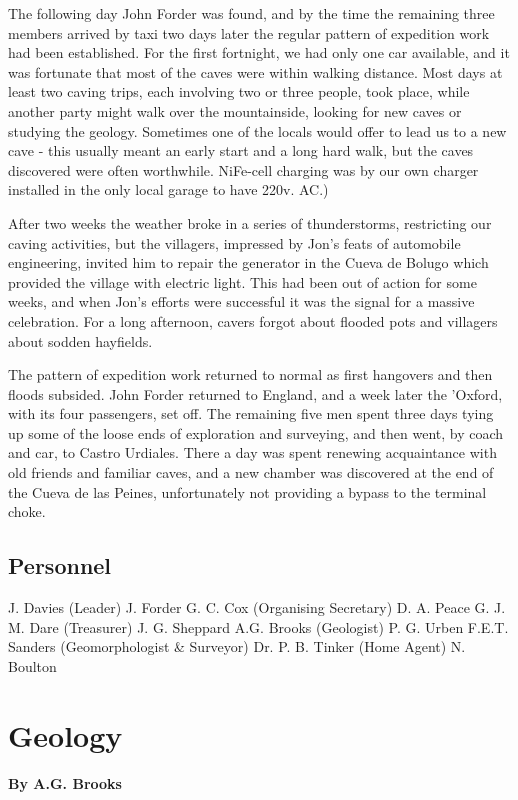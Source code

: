 \documentclass[11pt, a4paper, twoside]{memoir}
\begin{document}
The following day John Forder was found, and by the time the remaining three members arrived by taxi two days later the regular pattern of expedition work had been established. For the first fortnight, we had only one car available, and it was fortunate that most of the caves were within walking distance. Most days at least two caving trips, each involving two or three people, took place, while another party might walk over the mountainside, looking for new caves or studying the geology. Sometimes one of the locals would offer to lead us to a new cave - this usually meant an early start and a long hard walk, but the caves discovered were often worthwhile. NiFe-cell charging was by our own charger installed in the only local garage to have 220v. AC.)

After two weeks the weather broke in a series of thunderstorms, restricting our caving activities, but the villagers, impressed by Jon's feats of automobile engineering, invited him to repair the generator in the Cueva de Bolugo which provided the village with electric light. This had been out of action for some weeks, and when Jon's efforts were successful it was the signal for a massive celebration. For a long afternoon, cavers forgot about flooded pots and villagers about sodden hayfields.

The pattern of expedition work returned to normal as first hangovers and then floods subsided. John Forder returned to England, and a week later the 'Oxford, with its four passengers, set off. The remaining five men spent three days tying up some of the loose ends of exploration and surveying, and then went, by coach and car, to Castro Urdiales. There a day was spent renewing acquaintance with old friends and familiar caves, and a new chamber was discovered at the end of the Cueva de las Peines, unfortunately not providing a bypass to the terminal choke.


\section*{Personnel}

J. Davies (Leader)
J. Forder
G. C. Cox (Organising Secretary)
D. A. Peace
G. J. M. Dare (Treasurer)
J. G. Sheppard
A.G. Brooks (Geologist)
P. G. Urben
F.E.T. Sanders (Geomorphologist \& Surveyor)
Dr. P. B. Tinker (Home Agent)
N. Boulton


\chapter{Geology}
\textbf{By A.G. Brooks}
\end{document}
